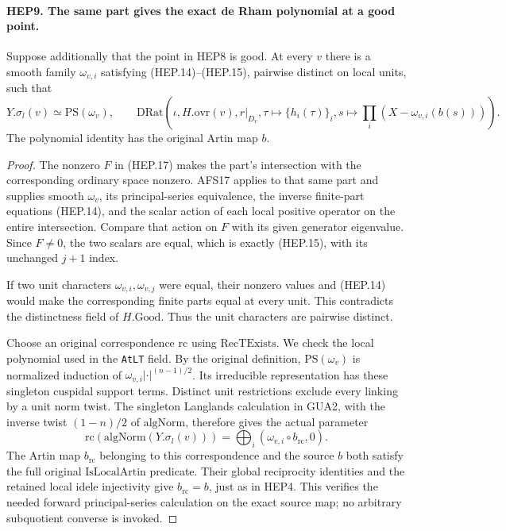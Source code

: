 \documentclass[11pt,a4paper]{article}
\numberwithin{equation}{section}
\theoremstyle{remark}\newtheorem{remark}[theorem]{Remark}
\begin{document}
\paragraph{HEP9. The same part gives the exact de Rham polynomial at a good point.}
\label{claim:HEP9}
Suppose additionally that the point in HEP8 is good.  At every $v$
there is a smooth family $\omega_{v,i}$ satisfying
(HEP.14)--(HEP.15), pairwise distinct on local units, such that
\[
 Y.\sigma_l(v)\simeq\mathrm{PS}(\omega_v),
 \qquad
 \mathrm{DRat}\left(\iota,H.\mathrm{ovr}(v),r|_{D_v},
     \tau\mapsto\{h_i(\tau)\}_i,
     s\mapsto\prod_i(X-\omega_{v,i}(b(s)))\right).
 \tag{HEP.18}
\]
The polynomial identity has the original Artin map $b$.
\begin{proof}
The nonzero $F$ in (HEP.17) makes the part's intersection with
the corresponding ordinary space nonzero.  AFS17 applies to
that same part and supplies smooth $\omega_v$, its principal-series
equivalence, the inverse finite-part equations (HEP.14), and the
scalar action of each local positive operator on the entire
intersection.  Compare that action on $F$ with its given
generator eigenvalue.  Since $F\ne0$, the two scalars are equal,
which is exactly (HEP.15), with its unchanged $j+1$ index.

If two unit characters $\omega_{v,i},\omega_{v,j}$ were equal,
their nonzero values and (HEP.14) would make the corresponding
finite parts equal at every unit.  This contradicts the distinctness
field of $H.\mathrm{Good}$.  Thus the unit characters are pairwise
distinct.

Choose an original correspondence $\mathrm{rc}$ using
$\mathrm{RecTExists}$.  We check the local polynomial used in
the \texttt{At\allowbreak LT} field.  By the original definition,
$\mathrm{PS}(\omega_v)$ is normalized induction of
$\omega_{v,i}|\cdot|^{(n-1)/2}$.  Its irreducible representation
has these singleton cuspidal support terms.  Distinct unit
restrictions exclude every linking by a unit norm twist.
The singleton Langlands calculation in GUA2, with the inverse
twist $(1-n)/2$ of $\mathrm{algNorm}$, therefore gives the actual
parameter
\[
 \mathrm{rc}(\mathrm{algNorm}(Y.\sigma_l(v)))
                   =\bigoplus_i(\omega_{v,i}\circ b_{\mathrm{rc}},0).
 \tag{HEP.19}
\]
The Artin map $b_{\mathrm{rc}}$ belonging to this correspondence
and the source $b$ both satisfy the full original
$\mathrm{IsLocalArtin}$ predicate.  Their global reciprocity
identities and the retained local idele injectivity give
$b_{\mathrm{rc}}=b$, just as in HEP4.
This verifies the needed forward principal-series calculation on
the exact source map; no arbitrary subquotient converse is invoked.


\end{proof}
\end{document}
